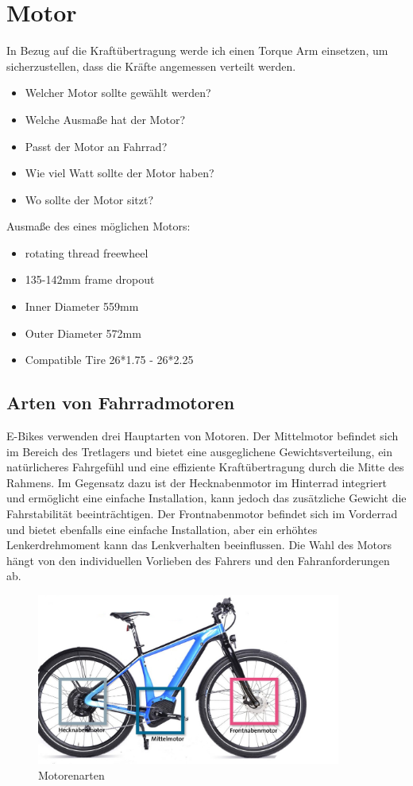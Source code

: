 \chapter{Motor}
In Bezug auf die Kraftübertragung werde ich einen Torque Arm einsetzen, um sicherzustellen, dass die Kräfte angemessen verteilt werden.
\begin{itemize}
    \item Welcher Motor sollte gewählt werden?
    \item Welche Ausmaße hat der Motor?
    \item Passt der Motor an Fahrrad?
    \item Wie viel Watt sollte der Motor haben?
    \item Wo sollte der Motor sitzt?
\end{itemize}


Ausmaße des eines möglichen Motors:
\begin{itemize}
    \item rotating thread freewheel
    \item 135-142mm frame dropout
    \item Inner Diameter 559mm
    \item Outer Diameter 572mm
    \item Compatible Tire 26*1.75 - 26*2.25
\end{itemize}
\section{Arten von Fahrradmotoren}
E-Bikes verwenden drei Hauptarten von Motoren. Der Mittelmotor befindet sich im Bereich des Tretlagers und bietet eine ausgeglichene Gewichtsverteilung, ein natürlicheres Fahrgefühl und eine effiziente Kraftübertragung durch die Mitte des Rahmens. Im Gegensatz dazu ist der Hecknabenmotor im Hinterrad integriert und ermöglicht eine einfache Installation, kann jedoch das zusätzliche Gewicht die Fahrstabilität beeinträchtigen. Der Frontnabenmotor befindet sich im Vorderrad und bietet ebenfalls eine einfache Installation, aber ein erhöhtes Lenkerdrehmoment kann das Lenkverhalten beeinflussen. Die Wahl des Motors hängt von den individuellen Vorlieben des Fahrers und den Fahranforderungen ab.
\begin{figure}[h]
    \centering
    \includegraphics[width=10cm]{images/Kaufberatung-Motor-1.jpg}
    \caption{Motorenarten\cite{noauthor_e-bike_nodate}}%
    \label{fig:7}
\end{figure}

